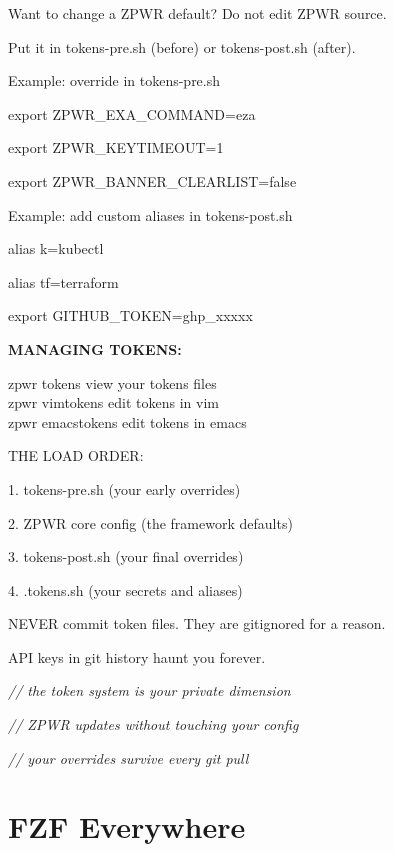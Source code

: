 \documentclass[11pt,a4paper,twoside]{book}
\begin{document}
Want to change a ZPWR default? Do not edit ZPWR source.

Put it in tokens-pre.sh (before) or tokens-post.sh (after).

Example: override in tokens-pre.sh

\begin{codebox}
export ZPWR\_EXA\_COMMAND=eza\\
\end{codebox}

export ZPWR\_KEYTIMEOUT=1

export ZPWR\_BANNER\_CLEARLIST=false

Example: add custom aliases in tokens-post.sh

alias k=kubectl

alias tf=terraform

export GITHUB\_TOKEN=ghp\_xxxxx


\vspace{12pt}
{\bfseries\color{neonyellow} MANAGING TOKENS:}\vspace{4pt}

\begin{codebox}
zpwr tokens           view your tokens files\\
zpwr vimtokens        edit tokens in vim\\
zpwr emacstokens      edit tokens in emacs\\
\end{codebox}

THE LOAD ORDER:

1. tokens-pre.sh      (your early overrides)

2. ZPWR core config    (the framework defaults)

3. tokens-post.sh     (your final overrides)

4. .tokens.sh         (your secrets and aliases)

NEVER commit token files. They are gitignored for a reason.

API keys in git history haunt you forever.

{\small\itshape\color{dimtext} // the token system is your private dimension}

{\small\itshape\color{dimtext} // ZPWR updates without touching your config}

{\small\itshape\color{dimtext} // your overrides survive every git pull}


\vspace{16pt}

\section{FZF Everywhere}
\end{document}
